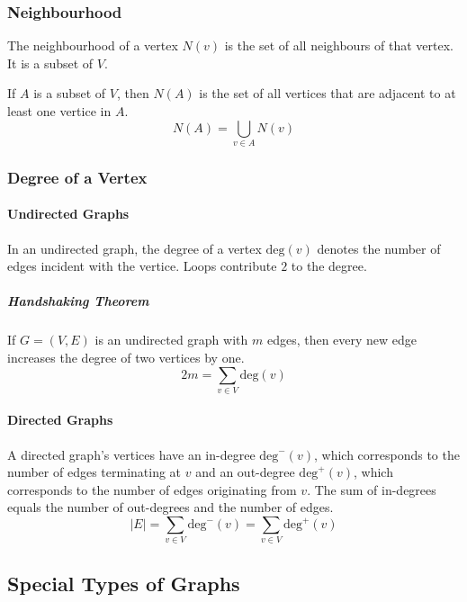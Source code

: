 \documentclass[a4paper, 10pt]{article}
\begin{document}
\subsubsection{Neighbourhood}
The neighbourhood of a vertex \(N(v)\) is the set of all neighbours of that vertex. It is a subset of \(V\).

If \(A\) is a subset of \(V\), then \(N(A)\) is the set of all vertices that are adjacent to at least one vertice in \(A\).
\[ N(A) = \bigcup_{v\in A} N(v) \]
\subsubsection{Degree of a Vertex}
\paragraph{Undirected Graphs}
In an undirected graph, the degree of a vertex \(\mathrm{deg}(v)\) denotes the number of edges incident with the vertice. Loops contribute \(2\) to the degree.
\subparagraph{Handshaking Theorem}
If \(G=(V,E)\) is an undirected graph with \(m\) edges, then every new edge increases the degree of two vertices by one.
\[ 2m = \sum_{v\in V} \mathrm{deg}(v) \]
\paragraph{Directed Graphs}
A directed graph's vertices have an in-degree \(\mathrm{deg}^-(v)\), which corresponds to the number of edges terminating at \(v\) and an out-degree \(\mathrm{deg}^+(v)\), which corresponds to the number of edges originating from \(v\). The sum of in-degrees equals the number of out-degrees and the number of edges.
\[ |E| = \sum_{v\in V}\mathrm{deg}^-(v) = \sum_{v\in V}\mathrm{deg}^+(v) \]
\subsection{Special Types of Graphs}
\end{document}
